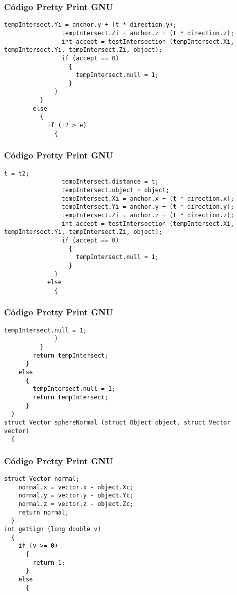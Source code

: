 \documentclass{beamer}
\begin{document}
\begin{frame}[fragile]
\frametitle{C\'odigo Pretty Print GNU}
\begin{lstlisting}[style=CStyle]
                tempIntersect.Yi = anchor.y + (t * direction.y);
                tempIntersect.Zi = anchor.z + (t * direction.z);
                int accept = testIntersection (tempIntersect.Xi, tempIntersect.Yi, tempIntersect.Zi, object);
                if (accept == 0)
                  {
                    tempIntersect.null = 1;
                  }
              }
          }
        else
          {
            if (t2 > e)
              {
                \end{lstlisting}
\end{frame}
\begin{frame}[fragile]
\frametitle{C\'odigo Pretty Print GNU}
\begin{lstlisting}[style=CStyle]
                t = t2;
                tempIntersect.distance = t;
                tempIntersect.object = object;
                tempIntersect.Xi = anchor.x + (t * direction.x);
                tempIntersect.Yi = anchor.y + (t * direction.y);
                tempIntersect.Zi = anchor.z + (t * direction.z);
                int accept = testIntersection (tempIntersect.Xi, tempIntersect.Yi, tempIntersect.Zi, object);
                if (accept == 0)
                  {
                    tempIntersect.null = 1;
                  }
              }
            else
              {
                \end{lstlisting}
\end{frame}
\begin{frame}[fragile]
\frametitle{C\'odigo Pretty Print GNU}
\begin{lstlisting}[style=CStyle]
                tempIntersect.null = 1;
              }
          }
        return tempIntersect;
      }
    else
      {
        tempIntersect.null = 1;
        return tempIntersect;
      }
  }
struct Vector sphereNormal (struct Object object, struct Vector vector)
  {
    \end{lstlisting}
\end{frame}
\begin{frame}[fragile]
\frametitle{C\'odigo Pretty Print GNU}
\begin{lstlisting}[style=CStyle]
    struct Vector normal;
    normal.x = vector.x - object.Xc;
    normal.y = vector.y - object.Yc;
    normal.z = vector.z - object.Zc;
    return normal;
  }
int getSign (long double v)
  {
    if (v >= 0)
      {
        return 1;
      }
    else
      {
        \end{lstlisting}
\end{frame}
\end{document}
